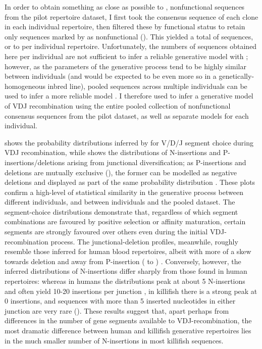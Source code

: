 In order to obtain something as close as possible to \naive, nonfunctional sequences from the pilot repertoire dataset, I first took the consensus sequence of each clone in each individual repertoire, then filtered these by functional status to retain only sequences marked by  as nonfunctional (). This yielded a total of  sequences, or  to  per individual repertoire. Unfortunately, the numbers of sequences obtained here per individual are not sufficient to infer a reliable generative model with  \parencite{marcou2018igor,marcou2019perscomm}; however, as the parameters of the generative process tend to be highly similar between individuals (and would be expected to be even more so in a genetically-homogeneous inbred line), pooled sequences across multiple individuals can be used to infer a more reliable model \parencite{marcou2019perscomm}. I therefore used  to infer a generative model of VDJ recombination using the entire pooled collection of nonfunctional consensus sequences from the pilot dataset, as well as separate models for each individual. 

 shows the probability distributions inferred by  for V/D/J segment choice during VDJ recombination, while  shows the distributions of N-insertions and P-insertions/deletions arising from junctional diversification; as P-insertions and deletions are mutually exclusive (), the former can be modelled as negative deletions and displayed as part of the same probability distribution \parencite{elhanati2015model}. These plots confirm a high-level of statistical similarity in the generative process between different individuals, and between individuals and the pooled dataset. The segment-choice distributions demonstrate that, regardless of which segment combinations are favoured by positive selection or affinity maturation, certain segments are strongly favoured over others even during the initial VDJ-recombination process. The junctional-deletion profiles, meanwhile, roughly resemble those inferred for human blood repertoires, albeit with more of a skew towards deletion and away from P-insertion ( to ) \parencite{elhanati2015model}. Conversely, however, the inferred distributions of N-insertions differ sharply from those found in human repertoires: whereas in humans the distributions peak at about 5 N-insertions and often yield 10-20 insertions per junction \parencite{elhanati2015model}, in killifish there is a strong peak at 0 insertions, and sequences with more than 5 inserted nucleotides in either junction are very rare (). These results suggest that, apart perhaps from differences in the number of gene segments available to VDJ-recombination, the most dramatic difference between human and killifish generative repertoires lies in the much smaller number of N-insertions in most killifish sequences.


